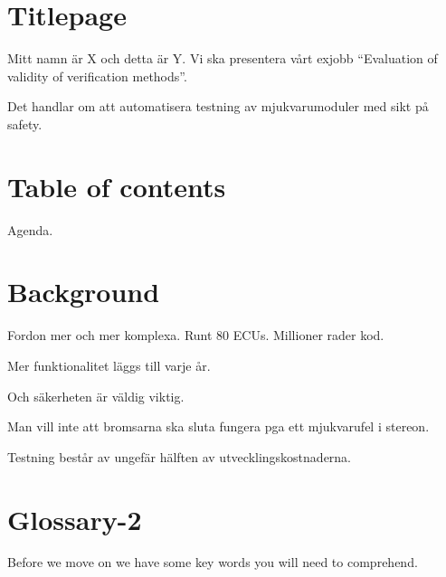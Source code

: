 \documentclass[a4paper]{article}
\begin{document}
\section{Titlepage}
Mitt namn är X och detta är Y. Vi ska presentera vårt exjobb
``Evaluation of validity of verification methods''.

Det handlar om att automatisera testning av mjukvarumoduler med sikt
på safety.

\section{Table of contents}
Agenda.

\section{Background}
Fordon mer och mer komplexa. Runt 80 ECUs. Millioner rader kod.


Mer funktionalitet läggs till varje år.

Och säkerheten är väldig viktig.

Man vill inte att bromsarna ska sluta fungera pga ett mjukvarufel i stereon.

Testning består av ungefär hälften av utvecklingskostnaderna.

\section{Glossary-2}
Before we move on we have some key words you will need to comprehend.
\end{document}
